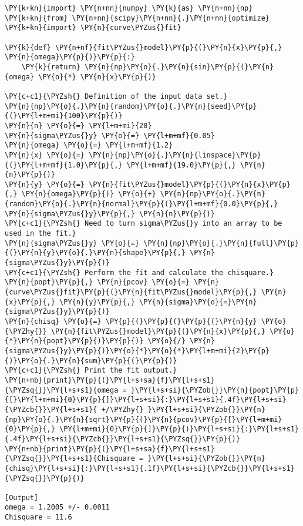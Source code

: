 \begin{Verbatim}[label=\makebox{\href{https://bitbucket.org/lbaldini/statnotes/src/master/snippets/fit\_sin.py}{https://bitbucket.org/.../fit\_sin.py}},commandchars=\\\{\}]
\PY{k+kn}{import} \PY{n+nn}{numpy} \PY{k}{as} \PY{n+nn}{np}
\PY{k+kn}{from} \PY{n+nn}{scipy}\PY{n+nn}{.}\PY{n+nn}{optimize} \PY{k+kn}{import} \PY{n}{curve\PYZus{}fit}

\PY{k}{def} \PY{n+nf}{fit\PYZus{}model}\PY{p}{(}\PY{n}{x}\PY{p}{,} \PY{n}{omega}\PY{p}{)}\PY{p}{:}
    \PY{k}{return} \PY{n}{np}\PY{o}{.}\PY{n}{sin}\PY{p}{(}\PY{n}{omega} \PY{o}{*} \PY{n}{x}\PY{p}{)}

\PY{c+c1}{\PYZsh{} Definition of the input data set.}
\PY{n}{np}\PY{o}{.}\PY{n}{random}\PY{o}{.}\PY{n}{seed}\PY{p}{(}\PY{l+m+mi}{100}\PY{p}{)}
\PY{n}{n} \PY{o}{=} \PY{l+m+mi}{20}
\PY{n}{sigma\PYZus{}y} \PY{o}{=} \PY{l+m+mf}{0.05}
\PY{n}{omega} \PY{o}{=} \PY{l+m+mf}{1.2}
\PY{n}{x} \PY{o}{=} \PY{n}{np}\PY{o}{.}\PY{n}{linspace}\PY{p}{(}\PY{l+m+mf}{1.0}\PY{p}{,} \PY{l+m+mf}{19.0}\PY{p}{,} \PY{n}{n}\PY{p}{)}
\PY{n}{y} \PY{o}{=} \PY{n}{fit\PYZus{}model}\PY{p}{(}\PY{n}{x}\PY{p}{,} \PY{n}{omega}\PY{p}{)} \PY{o}{+} \PY{n}{np}\PY{o}{.}\PY{n}{random}\PY{o}{.}\PY{n}{normal}\PY{p}{(}\PY{l+m+mf}{0.0}\PY{p}{,} \PY{n}{sigma\PYZus{}y}\PY{p}{,} \PY{n}{n}\PY{p}{)}
\PY{c+c1}{\PYZsh{} Need to turn sigma\PYZus{}y into an array to be used in the fit.}
\PY{n}{sigma\PYZus{}y} \PY{o}{=} \PY{n}{np}\PY{o}{.}\PY{n}{full}\PY{p}{(}\PY{n}{y}\PY{o}{.}\PY{n}{shape}\PY{p}{,} \PY{n}{sigma\PYZus{}y}\PY{p}{)}
\PY{c+c1}{\PYZsh{} Perform the fit and calculate the chisquare.}
\PY{n}{popt}\PY{p}{,} \PY{n}{pcov} \PY{o}{=} \PY{n}{curve\PYZus{}fit}\PY{p}{(}\PY{n}{fit\PYZus{}model}\PY{p}{,} \PY{n}{x}\PY{p}{,} \PY{n}{y}\PY{p}{,} \PY{n}{sigma}\PY{o}{=}\PY{n}{sigma\PYZus{}y}\PY{p}{)}
\PY{n}{chisq} \PY{o}{=} \PY{p}{(}\PY{p}{(}\PY{p}{(}\PY{n}{y} \PY{o}{\PYZhy{}} \PY{n}{fit\PYZus{}model}\PY{p}{(}\PY{n}{x}\PY{p}{,} \PY{o}{*}\PY{n}{popt}\PY{p}{)}\PY{p}{)} \PY{o}{/} \PY{n}{sigma\PYZus{}y}\PY{p}{)}\PY{o}{*}\PY{o}{*}\PY{l+m+mi}{2}\PY{p}{)}\PY{o}{.}\PY{n}{sum}\PY{p}{(}\PY{p}{)}
\PY{c+c1}{\PYZsh{} Print the fit output.}
\PY{n+nb}{print}\PY{p}{(}\PY{l+s+sa}{f}\PY{l+s+s1}{\PYZsq{}}\PY{l+s+s1}{omega = }\PY{l+s+si}{\PYZob{}}\PY{n}{popt}\PY{p}{[}\PY{l+m+mi}{0}\PY{p}{]}\PY{l+s+si}{:}\PY{l+s+s1}{.4f}\PY{l+s+si}{\PYZcb{}}\PY{l+s+s1}{ +/\PYZhy{} }\PY{l+s+si}{\PYZob{}}\PY{n}{np}\PY{o}{.}\PY{n}{sqrt}\PY{p}{(}\PY{n}{pcov}\PY{p}{[}\PY{l+m+mi}{0}\PY{p}{,} \PY{l+m+mi}{0}\PY{p}{]}\PY{p}{)}\PY{l+s+si}{:}\PY{l+s+s1}{.4f}\PY{l+s+si}{\PYZcb{}}\PY{l+s+s1}{\PYZsq{}}\PY{p}{)}
\PY{n+nb}{print}\PY{p}{(}\PY{l+s+sa}{f}\PY{l+s+s1}{\PYZsq{}}\PY{l+s+s1}{Chisquare = }\PY{l+s+si}{\PYZob{}}\PY{n}{chisq}\PY{l+s+si}{:}\PY{l+s+s1}{.1f}\PY{l+s+si}{\PYZcb{}}\PY{l+s+s1}{\PYZsq{}}\PY{p}{)}

[Output]
omega = 1.2005 +/- 0.0011
Chisquare = 11.6
\end{Verbatim}